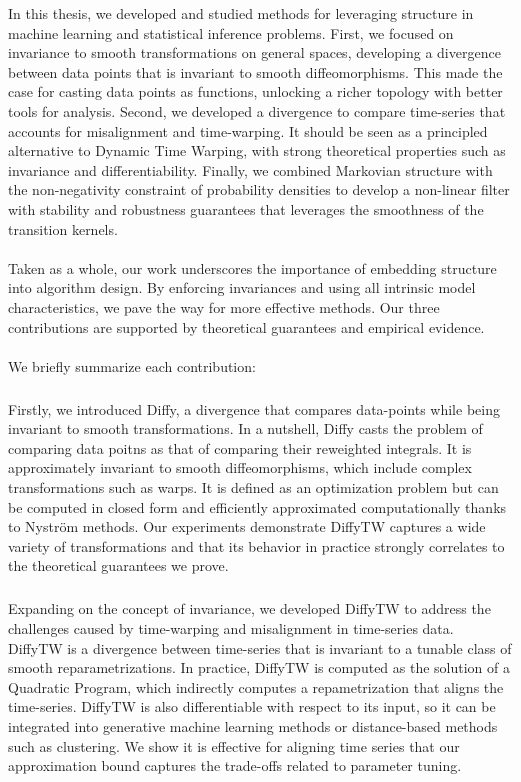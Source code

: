 
In this thesis, we developed and studied methods for leveraging structure in machine learning and statistical inference problems. First, we focused on invariance to smooth transformations on general spaces, developing a divergence between data points that is invariant to smooth diffeomorphisms. This made the case for casting data points as functions, unlocking a richer topology with better tools for analysis. Second, we developed a divergence to compare time-series that accounts for misalignment and time-warping. It should be seen as a principled alternative to Dynamic Time Warping, with strong theoretical properties such as invariance and differentiability. Finally, we combined Markovian structure with the non-negativity constraint of probability densities to develop a non-linear filter with stability and robustness guarantees that leverages the smoothness of the transition kernels.

\paragraph{}
Taken as a whole, our work underscores the importance of embedding structure into algorithm design. By enforcing invariances and using all intrinsic model characteristics, we pave the way for more effective methods. Our three contributions are supported by theoretical guarantees and empirical evidence.

\paragraph{}
\noindent We briefly summarize each contribution:

\subparagraph{}
Firstly, we introduced Diffy, a divergence that compares data-points while being invariant to smooth transformations. In a nutshell, Diffy casts the problem of comparing data poitns as that of comparing their reweighted integrals. It is approximately invariant to smooth diffeomorphisms, which include complex transformations such as warps. It is defined as an optimization problem but can be computed in closed form and efficiently approximated computationally thanks to Nyström methods. Our experiments demonstrate DiffyTW captures a wide variety of transformations and that its behavior in practice strongly correlates to the theoretical guarantees we prove.

\subparagraph{}
Expanding on the concept of invariance, we developed DiffyTW to address the challenges caused by time-warping and misalignment in time-series data. DiffyTW is a divergence between time-series that is invariant to a tunable class of smooth reparametrizations. In practice, DiffyTW is computed as the solution of a Quadratic Program, which indirectly computes a repametrization that aligns the time-series. DiffyTW is also differentiable with respect to its input, so it can be integrated into generative machine learning methods or distance-based methods such as clustering. We show it is effective for aligning time series that our approximation bound captures the trade-offs related to parameter tuning.

